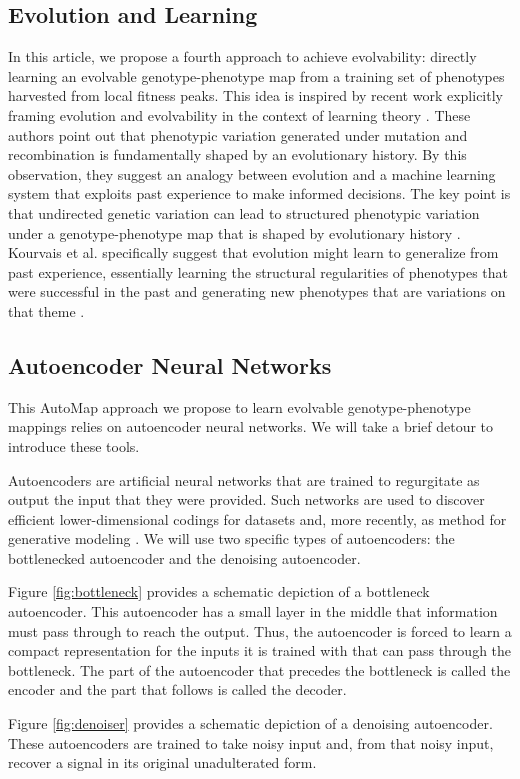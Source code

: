 \subsection{Evolution and Learning}

In this article, we propose a fourth approach to achieve evolvability: directly learning an evolvable genotype-phenotype map from a training set of phenotypes harvested from local fitness peaks.
This idea is inspired by recent work explicitly framing evolution and evolvability in the context of learning theory \cite{kouvaris2017evolution, watson2016can}.
These authors point out that phenotypic variation generated under mutation and recombination is fundamentally shaped by an evolutionary history.
By this observation, they suggest an analogy between evolution and a machine learning system that exploits past experience to make informed decisions.
The key point is that undirected genetic variation can lead to structured phenotypic variation under a genotype-phenotype map that is shaped by evolutionary history \cite{watson2016can}.
Kourvais et al. specifically suggest that evolution might learn to generalize from past experience, essentially learning the structural regularities of phenotypes that were successful in the past and generating new phenotypes that are variations on that theme \cite{kouvaris2017evolution}.

\subsection{Autoencoder Neural Networks}

This AutoMap approach we propose to learn evolvable genotype-phenotype mappings relies on autoencoder neural networks.
We will take a brief detour to introduce these tools.

Autoencoders are artificial neural networks that are trained to regurgitate as output the input that they were provided.
Such networks are used to discover efficient lower-dimensional codings for datasets and, more recently, as method for generative modeling \cite{liou2014autoencoder, kingma2013auto}.
We will use two specific types of autoencoders: the bottlenecked autoencoder and the denoising autoencoder.



Figure \ref{fig:bottleneck} provides a schematic depiction of a bottleneck autoencoder.
This autoencoder has a small layer in the middle that information must pass through to reach the output.
Thus, the autoencoder is forced to learn a compact representation for the inputs it is trained with that can pass through the bottleneck.
The part of the autoencoder that precedes the bottleneck is called the encoder and the part that follows is called the decoder.

Figure \ref{fig:denoiser} provides a schematic depiction of a denoising autoencoder.
These autoencoders are trained to take noisy input and, from that noisy input, recover a signal in its original unadulterated form.
